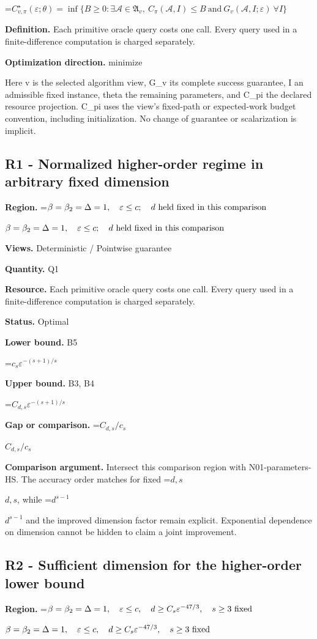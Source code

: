 \documentclass[10pt,a4paper]{article}
\newcommand{\AtlasMath}[1]{\par\begingroup\centering\setbox0=\hbox{$\displaystyle #1$}\ifdim\wd0>1.4\linewidth\typeout{ATLAS WIDE FORMULA: \the\wd0}\fi\ifdim\wd0>\linewidth\resizebox{\linewidth}{!}{\box0}\else\box0\fi\par\endgroup}
\newcommand{\AtlasInlineMath}[1]{\begingroup\setbox0=\hbox{$#1$}\ifdim\wd0>.4\linewidth\endgroup\AtlasMath{#1}\else\endgroup$#1$\fi}
\begin{document}
\AtlasMath{C^\star_{v,\pi}(\varepsilon;\theta)=\inf\{B\ge0:\exists\mathcal A\in\mathfrak A_v,\ C_\pi(\mathcal A,I)\le B\ \text{and}\ G_v(\mathcal A,I;\varepsilon)\ \forall I\}}
\textbf{Definition.} Each primitive oracle query costs one call. Every query used in a finite-difference computation is charged separately.

\textbf{Optimization direction.} minimize

Here v is the selected algorithm view, G\_v its complete success guarantee, I an admissible fixed instance, theta the remaining parameters, and C\_pi the declared resource projection. C\_pi uses the view's fixed-path or expected-work budget convention, including initialization. No change of guarantee or scalarization is implicit.

\subsection{R1 - Normalized higher-order regime in arbitrary fixed dimension}
\textbf{Region.} \AtlasInlineMath{\beta=\beta_2=\Delta=1,\quad\varepsilon\le c;\quad d\text{ \text{held fixed in this comparison}}}

\textbf{Views.} Deterministic / Pointwise guarantee

\textbf{Quantity.} Q1

\textbf{Resource.} Each primitive oracle query costs one call. Every query used in a finite-difference computation is charged separately.

\textbf{Status.} Optimal

\textbf{Lower bound.} B5

\AtlasMath{c_s\varepsilon^{-(s+1)/s}}
\textbf{Upper bound.} B3, B4

\AtlasMath{C_{d,s}\varepsilon^{-(s+1)/s}}
\textbf{Gap or comparison.} \AtlasInlineMath{C_{d,s}/c_s}

\textbf{Comparison argument.} Intersect this comparison region with N01-parameters-HS. The accuracy order matches for fixed \AtlasInlineMath{d,s}, while \AtlasInlineMath{d^{s-1}} and the improved dimension factor remain explicit. Exponential dependence on dimension cannot be hidden to claim a joint improvement.

\subsection{R2 - Sufficient dimension for the higher-order lower bound}
\textbf{Region.} \AtlasInlineMath{\beta=\beta_2=\Delta=1,\quad\varepsilon\le c,\quad d\ge C_s\varepsilon^{-47/3},\quad s\ge3\text{ \text{fixed}}}
\end{document}
